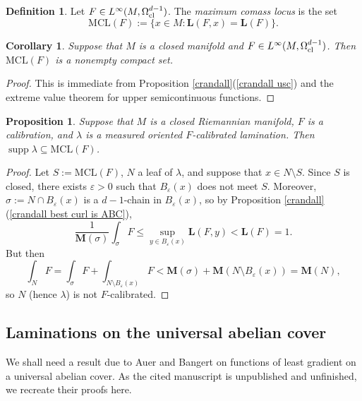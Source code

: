 \documentclass[reqno,11pt]{amsart}
\DeclareMathOperator{\supp}{supp}
\newcommand{\MCL}{\mathrm{MCL}}
\newcommand{\Mass}{\mathbf M}
\newcommand{\Comass}{\mathbf L}
\newcommand{\dfn}[1]{\emph{#1}\index{#1}}
\newtheorem{proposition}[theorem]{Proposition}
\newtheorem{corollary}[theorem]{Corollary}
\theoremstyle{definition}
\newtheorem{definition}[theorem]{Definition}
\numberwithin{equation}{section}
\begin{document}
\begin{definition}
Let $F \in L^\infty(M, \Omega^{d - 1}_{\rm cl})$.
The \dfn{maximum comass locus} is the set
$$\MCL(F) := \{x \in M: \Comass(F, x) = \Comass(F)\}.$$
\end{definition}

\begin{corollary}
Suppose that $M$ is a closed manifold and $F \in L^\infty(M, \Omega^{d - 1}_{\rm cl})$.
Then $\MCL(F)$ is a nonempty compact set.
\end{corollary}
\begin{proof}
This is immediate from Proposition \ref{crandall}(\ref{crandall usc}) and the extreme value theorem for upper semicontinuous functions.
\end{proof}

\begin{proposition}\label{properties of calibrated laminations}
Suppose that $M$ is a closed Riemannian manifold, $F$ is a calibration, and $\lambda$ is a measured oriented $F$-calibrated lamination.
Then $\supp \lambda \subseteq \MCL(F)$.
\end{proposition}
\begin{proof}
Let $S := \MCL(F)$, $N$ a leaf of $\lambda$, and suppose that $x \in N \setminus S$.
Since $S$ is closed, there exists $\varepsilon > 0$ such that $B_\varepsilon(x)$ does not meet $S$.
Moreover, $\sigma := N \cap B_\varepsilon(x)$ is a $d-1$-chain in $B_\varepsilon(x)$, so by Proposition \ref{crandall}(\ref{crandall best curl is ABC}),
$$\frac{1}{\Mass(\sigma)} \int_\sigma F \leq \sup_{y \in B_\varepsilon(x)} \Comass(F, y) < \Comass(F) = 1.$$
But then 
$$\int_N F = \int_\sigma F + \int_{N \setminus B_\varepsilon(x)} F < \Mass(\sigma) + \Mass(N \setminus B_\varepsilon(x)) = \Mass(N),$$
so $N$ (hence $\lambda$) is not $F$-calibrated.
\end{proof}

\subsection{Laminations on the universal abelian cover}
We shall need a result due to Auer and Bangert \cite{Auer12} on functions of least gradient on a universal abelian cover.
As the cited manuscript is unpublished and unfinished, we recreate their proofs here.
\end{document}
